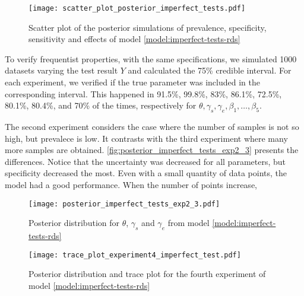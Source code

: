 \begin{figure}[ht]
  \centering
  \caption{\label{fig:scatter_plot_posterior_imperfect_tests} Scatter plot of
  the posterior simulations of prevalence, specificity, sensitivity and effects of model
  \eqref{model:imperfect-tests-rds}}
  \texttt{[image: scatter\_plot\_posterior\_imperfect\_tests.pdf]}
\end{figure}

To verify frequentist properties, with the same specifications, 
we simulated 1000 datasets varying the test result $Y$ and calculated the 
75\% credible interval. For each experiment, we
verified if the true parameter was included in the corresponding interval.
This happened in 91.5\%, 99.8\%, 83\%, 86.1\%, 72.5\%, 80.1\%, 80.4\%, and 70\% of the
times, respectively for $\theta, \gamma_s, \gamma_e, \beta_1, \dots, \beta_5$.

The second experiment considers the case where the number of samples is not so
high, but prevalece is low. It contrasts with the third experiment where many
more samples are obtained. \autoref{fig:posterior_imperfect_tests_exp2_3}
presents the differences. Notice that the uncertainty was decreased for all
parameters, but specificity decreased the most. Even with a small quantity of
data points, the model had a good performance. When the number of points
increase, 

\begin{figure}[ht]
  \centering
  \caption{\label{fig:posterior_imperfect_tests_exp2_3} Posterior
  distribution for $\theta$, $\gamma_s$ and $\gamma_e$ from model
  \eqref{model:imperfect-tests-rds}}
  \texttt{[image: posterior\_imperfect\_tests\_exp2\_3.pdf]}
\end{figure}

\begin{figure}[htbp]
  \centering
  \caption{\label{fig:trace_plot_experiment4_imperfect_test}Posterior distribution
  and trace plot for the fourth experiment of model
  \eqref{model:imperfect-tests-rds}}
  \texttt{[image: trace\_plot\_experiment4\_imperfect\_test.pdf]}
\end{figure}


